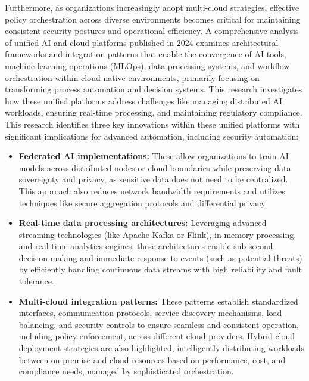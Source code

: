 Furthermore, as organizations increasingly adopt multi-cloud strategies, effective policy orchestration across diverse environments becomes critical for maintaining consistent security postures and operational efficiency\cite{sushil_prabhu_prabhakaran_integration_2024}. A comprehensive analysis of unified AI and cloud platforms published in 2024 examines architectural frameworks and integration patterns that enable the convergence of AI tools, machine learning operations (MLOps), data processing systems, and workflow orchestration within cloud-native environments, primarily focusing on transforming process automation and decision systems\cite{sushil_prabhu_prabhakaran_integration_2024}. This research investigates how these unified platforms address challenges like managing distributed AI workloads, ensuring real-time processing, and maintaining regulatory compliance\cite{sushil_prabhu_prabhakaran_integration_2024}.
This research identifies three key innovations within these unified platforms with significant implications for advanced automation, including security automation:
\begin{itemize}
    \item \textbf{Federated AI implementations:} These allow organizations to train AI models across distributed nodes or cloud boundaries while preserving data sovereignty and privacy, as sensitive data does not need to be centralized. This approach also reduces network bandwidth requirements and utilizes techniques like secure aggregation protocols and differential privacy\cite{sushil_prabhu_prabhakaran_integration_2024}.
    \item \textbf{Real-time data processing architectures:} Leveraging advanced streaming technologies (like Apache Kafka or Flink), in-memory processing, and real-time analytics engines, these architectures enable sub-second decision-making and immediate response to events (such as potential threats) by efficiently handling continuous data streams with high reliability and fault tolerance\cite{sushil_prabhu_prabhakaran_integration_2024}.
    \item \textbf{Multi-cloud integration patterns:} These patterns establish standardized interfaces, communication protocols, service discovery mechanisms, load balancing, and security controls to ensure seamless and consistent operation, including policy enforcement, across different cloud providers. Hybrid cloud deployment strategies are also highlighted, intelligently distributing workloads between on-premise and cloud resources based on performance, cost, and compliance needs, managed by sophisticated orchestration\cite{sushil_prabhu_prabhakaran_integration_2024}.
\end{itemize}

